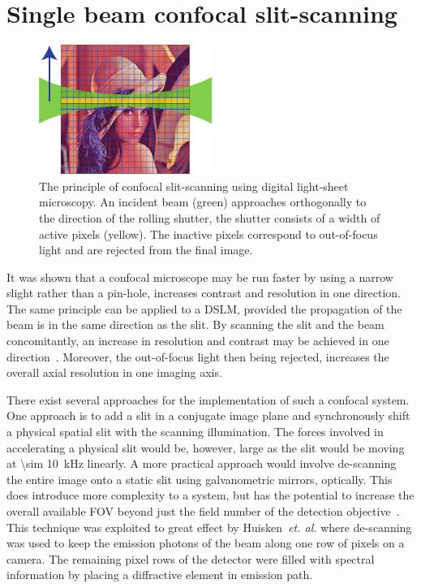 \pagebreak

\section{Single beam confocal \gls{slit-scanning}}

\begin{figure}
  \centering
  \includegraphics[width=0.4\linewidth]{slit_scanning_alt}
  \caption[The principle of confocal \gls{slit-scanning} using digital light-sheet microscopy]{The principle of confocal \gls{slit-scanning} using digital light-sheet microscopy.
  An incident beam (green) approaches orthogonally to the direction of the rolling shutter, the shutter consists of a width of active pixels (yellow).
  The inactive pixels correspond to out-of-focus light and are rejected from the final image.}
  \label{fig:slit_scanning_alt}
\end{figure}

It was shown that a confocal microscope may be run faster by using a narrow slight rather than a pin-hole, increases contrast and resolution in one direction\cite{sabharwalSlitscanningConfocalMicroendoscope1999}.
The same principle can be applied to a \gls{DSLM}, provided the propagation of the beam is in the same direction as the slit.
By scanning the slit and the beam concomitantly, an increase in resolution and contrast may be achieved in one direction~\cite{baumgartScannedLightSheet2012}.
Moreover, the out-of-focus light then being rejected, increases the overall axial resolution in one imaging axis.

There exist several approaches for the implementation of such a confocal system.
One approach is to add a slit in a conjugate image plane and synchronously shift a physical spatial slit with the scanning illumination.
The forces involved in accelerating a physical slit would be, however, large as the slit would be moving at \SI{\sim 10}{\kilo\hertz} linearly.
A more practical approach would involve de-scanning the entire image onto a static slit using galvanometric mirrors, optically.
This does introduce more complexity to a system, but has the potential to increase the overall available \gls{FOV} beyond just the field number of the detection objective~\cite{jahrHyperspectralLightSheet2015}.
This technique was exploited to great effect by Huisken~\emph{et. al.} where de-scanning was used to keep the emission photons of the beam along one row of pixels on a camera.
The remaining pixel rows of the detector were filled with spectral information by placing a diffractive element in emission path.

